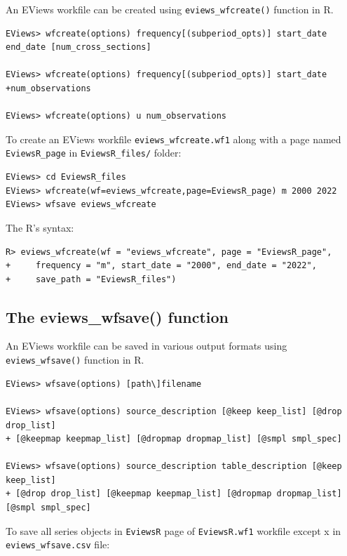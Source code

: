 An EViews workfile can be created using \texttt{eviews\_wfcreate()} function in R.

\begin{verbatim}
EViews> wfcreate(options) frequency[(subperiod_opts)] start_date end_date [num_cross_sections]

EViews> wfcreate(options) frequency[(subperiod_opts)] start_date +num_observations

EViews> wfcreate(options) u num_observations
\end{verbatim}

To create an EViews workfile \texttt{eviews\_wfcreate.wf1} along with a page named \texttt{EviewsR\_page} in \texttt{EviewsR\_files/} folder:

\begin{verbatim}
EViews> cd EviewsR_files
EViews> wfcreate(wf=eviews_wfcreate,page=EviewsR_page) m 2000 2022
EViews> wfsave eviews_wfcreate
\end{verbatim}

The R's syntax:

\begin{verbatim}
R> eviews_wfcreate(wf = "eviews_wfcreate", page = "EviewsR_page",
+     frequency = "m", start_date = "2000", end_date = "2022",
+     save_path = "EviewsR_files")
\end{verbatim}

\hypertarget{the-eviews_wfsave-function}{%
\subsection{The eviews\_wfsave() function}\label{the-eviews_wfsave-function}}

An EViews workfile can be saved in various output formats using \texttt{eviews\_wfsave()} function in R.

\begin{verbatim}
EViews> wfsave(options) [path\]filename

EViews> wfsave(options) source_description [@keep keep_list] [@drop drop_list]
+ [@keepmap keepmap_list] [@dropmap dropmap_list] [@smpl smpl_spec]

EViews> wfsave(options) source_description table_description [@keep keep_list]
+ [@drop drop_list] [@keepmap keepmap_list] [@dropmap dropmap_list] [@smpl smpl_spec]
\end{verbatim}

To save all series objects in \texttt{EviewsR} page of \texttt{EviewsR.wf1} workfile except x in \texttt{eviews\_wfsave.csv} file:


